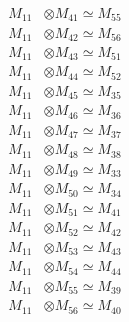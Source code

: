 \begin{align*}
M_{11} &\otimes M_{41} \simeq M_{55} \\
M_{11} &\otimes M_{42} \simeq M_{56} \\
M_{11} &\otimes M_{43} \simeq M_{51} \\
M_{11} &\otimes M_{44} \simeq M_{52} \\
M_{11} &\otimes M_{45} \simeq M_{35} \\
M_{11} &\otimes M_{46} \simeq M_{36} \\
M_{11} &\otimes M_{47} \simeq M_{37} \\
M_{11} &\otimes M_{48} \simeq M_{38} \\
M_{11} &\otimes M_{49} \simeq M_{33} \\
M_{11} &\otimes M_{50} \simeq M_{34} \\
M_{11} &\otimes M_{51} \simeq M_{41} \\
M_{11} &\otimes M_{52} \simeq M_{42} \\
M_{11} &\otimes M_{53} \simeq M_{43} \\
M_{11} &\otimes M_{54} \simeq M_{44} \\
M_{11} &\otimes M_{55} \simeq M_{39} \\
M_{11} &\otimes M_{56} \simeq M_{40} \\
\end{align*}

